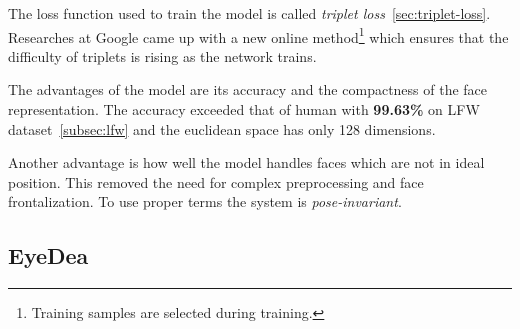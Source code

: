 The loss function used to train the model is called \textit{triplet loss}~\ref{sec:triplet-loss}.
Researches at Google came up with a new online method\footnote{Training samples are selected during training.} which
ensures that the difficulty of triplets is rising as the network trains.

The advantages of the model are its accuracy and the compactness of the face representation.
The accuracy exceeded that of human with \textbf{99.63\%} on LFW dataset~\ref{subsec:lfw} and the euclidean space has
only 128 dimensions.

Another advantage is how well the model handles faces which are not in ideal position.
This removed the need for complex preprocessing and face frontalization.
To use proper terms the system is \textit{pose-invariant}.

\subsection{EyeDea}\label{subsec:eyedea}
